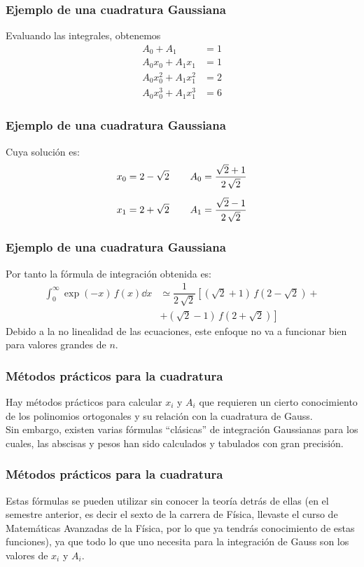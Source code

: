 \begin{frame}
\frametitle{Ejemplo de una cuadratura Gaussiana}
Evaluando las integrales, obtenemos
\begin{align*}
A_{0} + A_{1} &= 1 \\[0.5em]
A_{0} x_{0} + A_{1} x_{1} &= 1 \\[0.5em]
A_{0} x_{0}^{2} + A_{1} x_{1}^{2} &= 2 \\[0.5em]
A_{0} x_{0}^{3} + A_{1} x_{1}^{3} &= 6
\end{align*}
\end{frame}
\begin{frame}
\frametitle{Ejemplo de una cuadratura Gaussiana}
Cuya solución es:
\begin{align*}
x_{0} &= 2 - \sqrt{2} \hspace{0.75cm} A_{0} = \dfrac{\sqrt{2} + 1}{2 \, \sqrt{2}} \\[0.5em]
x_{1} &= 2 + \sqrt{2} \hspace{0.75cm} A_{1} = \dfrac{\sqrt{2} - 1}{2 \, \sqrt{2}}
\end{align*}
\end{frame}
\begin{frame}
\frametitle{Ejemplo de una cuadratura Gaussiana}
Por tanto la fórmula de integración obtenida es:
\begin{align*}
\int_{0}^{\infty} \exp(-x) \, f(x) \dd{x} & \simeq \dfrac{1}{2 \, \sqrt{2}} \left[ \left( \sqrt{2} + 1 \right) \, f \left(2 - \sqrt{2} \right) + \right. \\[0.5em] 
&+ \left. \left( \sqrt{2} - 1 \right) \, f \left(2 + \sqrt{2} \right) \right]
\end{align*}
\pause
Debido a la no linealidad de las ecuaciones, este enfoque no va a funcionar bien para valores grandes de $n$.
\end{frame}
\begin{frame}
\frametitle{Métodos prácticos para la cuadratura}
Hay métodos prácticos para calcular $x_{i}$ y $A_{i}$ que requieren un cierto conocimiento de los polinomios ortogonales y su relación con la cuadratura de Gauss.
\\
\bigskip
Sin embargo, existen varias fórmulas \enquote{clásicas} de integración Gaussianas para los cuales, las abscisas y pesos han sido calculados y tabulados con gran precisión.
\end{frame}
\begin{frame}
\frametitle{Métodos prácticos para la cuadratura}
Estas fórmulas se pueden utilizar sin conocer la teoría detrás de ellas (en el semestre anterior, es decir el sexto de la carrera de Física, llevaste el curso de Matemáticas Avanzadas de la Física, por lo que ya tendrás conocimiento de estas funciones), ya que todo lo que uno necesita para la integración de Gauss son los valores de $x_{i}$ y $A_{i}$.
\end{frame}
